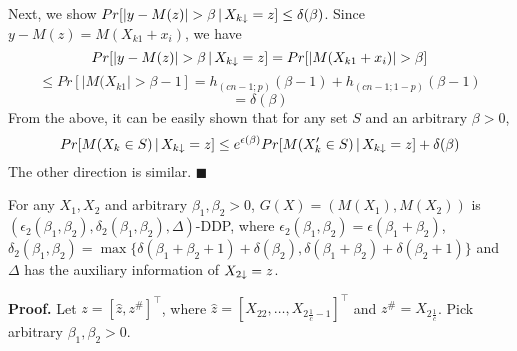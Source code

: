 \documentclass[11pt]{article}
\begin{document}
Next, we show $Pr[|y-M(z)| > \beta\,|\,X_{k \downarrow}=z] \leq \delta(\beta)$. Since $y- M(z) = M(X_{k1} + x_{i})$, we have
\[
Pr[|y-M(z)| > \beta\,|\,X_{k \downarrow}=z] = Pr[{|M(X_{k1}+ x_{i})| > \beta}]
\]
\[
\leq Pr[{|M(X_{k1}| > \beta -1}] = h_{(cn-1; p)}(\beta-1) + h_{(cn-1; 1-p)}(\beta-1)
\]
\[
=\delta(\beta)
\]
From the above, it can be easily shown that for any set $S$ and an arbitrary $\beta >0$,
\[
Pr[M(X_{k} \in S)\,|\,X_{k \downarrow}=z] \leq e^{\epsilon (\beta)} Pr[M(X_{k}' \in S)\,|\,X_{k \downarrow}=z] + \delta(\beta)
\]
The other direction is similar. $\blacksquare$

\begin{theorem}
For any $X_{1}, X_{2}$ and arbitrary $\beta_{1}, \beta_{2} >0$, $G(X)= ( M(X_{1}), M(X_{2}) )$ is $(\epsilon_{2}(\beta_{1}, \beta_{2}), \delta_{2}(\beta_{1}, \beta_{2}), \Delta)$-DDP, where $\epsilon_{2}(\beta_{1}, \beta_{2})=\epsilon(\beta_{1}+\beta_{2})$, $\delta_{2}(\beta_{1}, \beta_{2}) = \max \{ \delta(\beta_{1}+\beta_{2}+1)+ \delta(\beta_{2}) ,  \delta(\beta_{1}+\beta_{2})+ \delta(\beta_{2}+1) \}$ and $\Delta$ has the auxiliary information of $X_{2 \downarrow}=z$.
\end{theorem}
{\bf Proof.} Let $z = [\hat {z} , z^{\#}]^{\top}$, where $\hat {z} = [X_{22}, \dots , X_{2 \frac{1}{c}-1}]^{\top}$ and $z^{\#} = X_{2\frac{1}{c}}$. Pick arbitrary $\beta_{1}, \beta_{2} >0$. 
\end{document}
